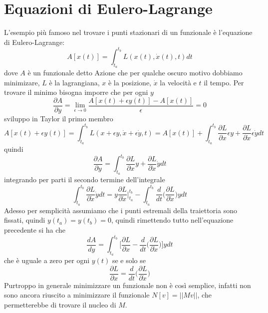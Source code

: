 \documentclass[11pt,a4paper]{report}
\theoremstyle{definition}
\theoremstyle{plain}
\theoremstyle{plain}
\begin{document}
		\section{Equazioni di Eulero-Lagrange}
			L'esempio più famoso nel trovare i punti stazionari di un funzionale è l'equazione di Eulero-Lagrange:
			\begin{equation}
				A[x(t)]=\int_{t_a}^{t_b}L(x(t),\dot{x}(t),t)dt
			\end{equation}
			dove $A$ è un funzionale detto Azione che per qualche oscuro motivo dobbiamo minimizare, $L$ è la lagrangiana, $x$ è la posizione, $\dot{x}$ la velocità e $t$ il tempo.
			Per trovare il minimo bisogna imporre che per ogni $y$
			\[
				\frac{\partial A}{\partial y}=\lim_{\epsilon \to 0}\frac{A[x(t)+\epsilon y(t)]-A[x(t)]}{\epsilon}=0
			\]
			sviluppo in Taylor il primo membro
			\[
				A[x(t)+\epsilon y(t)]=\int_{t_a}^{t_b}L(x+\epsilon y,\dot{x}+\epsilon \dot{y},t)=A[x(t)]+\int_{t_a}^{t_b}\frac{\partial{L}}{\partial{x}}\epsilon y+\frac{\partial{L}}{\partial{\dot{x}}}\epsilon \dot{y}dt
			\]
			quindi
			\[
				\frac{\partial A}{\partial y}=\int_{t_a}^{t_b}\frac{\partial{L}}{\partial{x}}y+\frac{\partial{L}}{\partial{\dot{x}}}\dot{y}dt
			\]
			integrando per parti il secondo termine dell'integrale
			\[
				\int_{t_a}^{t_b}\frac{\partial{L}}{\partial{\dot{x}}}\dot{y}dt=y\frac{\partial{L}}{\partial{\dot{x}}}\bigg\rvert_{t_a}^{t_b}-
				\int_{t_a}^{t_b}\frac{d}{dt}\bigg(\frac{\partial{L}}{\partial{\dot{x}}} \bigg)ydt
			\]
			Adesso per semplicità assumiamo che i punti estremali della traiettoria sono fissati, quindi $y(t_a)=y(t_b)=0$, quindi rimettendo tutto nell'equazione precedente si ha che
			\begin{equation}
				\frac{dA}{dy}=\int_{t_a}^{t_b}\bigg[\frac{\partial{L}}{\partial{x}}-\frac{d}{dt}\bigg(\frac{\partial{L}}{\partial{\dot{x}}} \bigg)\bigg]ydt
			\end{equation}
			che è uguale a zero per ogni $y(t)$ se e solo se 
			\begin{equation}
				\frac{\partial{L}}{\partial{x}}=\frac{d}{dt}\bigg(\frac{\partial{L}}{\partial{\dot{x}}} \bigg)
			\end{equation}
		Purtroppo in generale minimizzare un funzionale non è così semplice, infatti non sono ancora riuscito a minimizzare il funzionale $N[v]=||Mv||$, che permetterebbe di trovare il nucleo di $M$.
\end{document}
